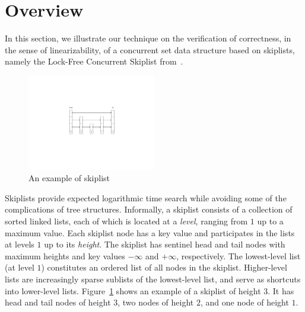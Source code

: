 \section{Overview}
\label{sec:overview}

In this section, we illustrate our technique on the verification of 
correctness, in the sense of linearizability, of
a concurrent set data structure based on skiplists, namely the
Lock-Free Concurrent Skiplist from~\cite[Section 14.4]{ArtOfMpP}.
\begin{figure} 
\vspace{-20pt}
  \begin{center}
 \includegraphics[width=0.5\textwidth, trim={11cm 10cm 10cm 9cm}, clip]{normalskipshape.pdf}  
    \caption{An example of skiplist}
    \label{normalskiplist}
  \end{center}
  \vspace{-35pt}
  \vspace{1pt}
\end{figure}
Skiplists provide expected logarithmic time search while avoiding some of the complications of tree structures.
Informally, a skiplist consists of a collection of sorted linked lists, each of which is located at a {\em level}, ranging from $1$ up to a maximum value. Each skiplist node has a key value and participates in the lists at levels $1$ up to its {\em height}.
The skiplist has sentinel head and tail nodes with maximum heights and key values $-\infty$ and $+\infty$, respectively.
The lowest-level list (at level $1$) constitutes an ordered list of all nodes
in the skiplist. Higher-level lists are increasingly sparse sublists of the
lowest-level list, and serve as shortcuts into lower-level lists. Figure~\ref{normalskiplist} shows an example of a skiplist of height 3. It has head and tail nodes of height $3$, two nodes of height $2$, and one node of height $1$.

